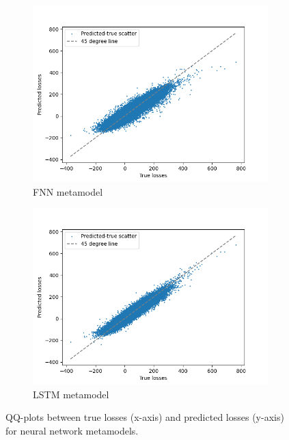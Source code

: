 \documentclass{article}
\begin{document}
\begin{figure}[ht!]
    \centering
    \begin{subfigure}{0.48\textwidth}
        \includegraphics[width=\textwidth]{./figures/qqPlots/fnnLN.png}
        \caption{FNN metamodel}
    \end{subfigure}\hfill
    \begin{subfigure}{0.48\textwidth}
        \includegraphics[width=\textwidth]{./figures/qqPlots/lstmLoCapLN.png}
        \caption{LSTM metamodel}
    \end{subfigure}
    \caption{QQ-plots between true losses (x-axis) and predicted losses (y-axis) for neural network metamodels.} 
    \label{fig:QQ_NN}
\end{figure}
\end{document}
